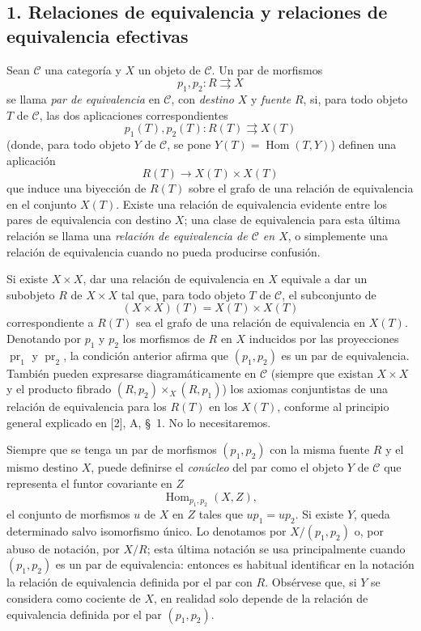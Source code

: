 \subsection*{1. Relaciones de equivalencia y relaciones de equivalencia efectivas}

Sean $\mathcal C$ una categoría y $X$ un objeto de $\mathcal C$. Un par de
morfismos
\[
  p_1,p_2:R\rightrightarrows X
\]
se llama \emph{par de equivalencia} en $\mathcal C$, con \emph{destino} $X$
y \emph{fuente} $R$, si, para todo objeto $T$ de $\mathcal C$, las dos
aplicaciones correspondientes
\[
  p_1(T),p_2(T):R(T)\rightrightarrows X(T)
\]
(donde, para todo objeto $Y$ de $\mathcal C$, se pone
$Y(T)=\operatorname{Hom}(T,Y)$) definen una aplicación
\[
  R(T)\longrightarrow X(T)\times X(T)
\]
que induce una biyección de $R(T)$ sobre el grafo de una relación de
equivalencia en el conjunto $X(T)$. Existe una relación de equivalencia
evidente entre los pares de equivalencia con destino $X$; una clase de
equivalencia para esta última relación se llama una \emph{relación de
equivalencia de $\mathcal C$ en $X$}, o simplemente una relación de
equivalencia cuando no pueda producirse confusión.

Si existe $X\times X$, dar una relación de equivalencia en $X$ equivale a dar
un subobjeto $R$ de $X\times X$ tal que, para todo objeto $T$ de $\mathcal C$,
el subconjunto de
\[
  (X\times X)(T)=X(T)\times X(T)
\]
correspondiente a $R(T)$ sea el grafo de una relación de equivalencia en
$X(T)$. Denotando por $p_1$ y $p_2$ los morfismos de $R$ en $X$ inducidos por
las proyecciones $\operatorname{pr}_1$ y $\operatorname{pr}_2$, la condición
anterior afirma que $(p_1,p_2)$ es un par de equivalencia. También pueden
expresarse diagramáticamente en $\mathcal C$ (siempre que existan $X\times X$
y el producto fibrado $(R,p_2)\times_X(R,p_1)$) los axiomas conjuntistas de
una relación de equivalencia para los $R(T)$ en los $X(T)$, conforme al
principio general explicado en [2], A, \S~1. No lo necesitaremos.

Siempre que se tenga un par de morfismos $(p_1,p_2)$ con la misma fuente $R$
y el mismo destino $X$, puede definirse el \emph{conúcleo} del par como el
objeto $Y$ de $\mathcal C$ que representa el funtor covariante en $Z$
\[
  \operatorname{Hom}_{p_1,p_2}(X,Z),
\]
el conjunto de morfismos $u$ de $X$ en $Z$ tales que $up_1=up_2$. Si existe
$Y$, queda determinado salvo isomorfismo único. Lo denotamos por
$X/(p_1,p_2)$ o, por abuso de notación, por $X/R$; esta última notación se usa
principalmente cuando
$(p_1,p_2)$ es un par de equivalencia: entonces es habitual
identificar en la notación la relación de equivalencia definida por el par con
$R$. Obsérvese que, si $Y$ se considera como cociente de $X$, en realidad solo
depende de la relación de equivalencia definida por el par $(p_1,p_2)$.

